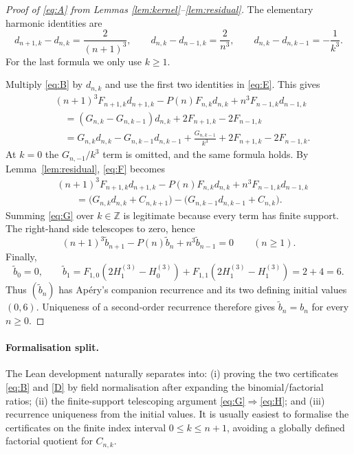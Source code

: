 \documentclass[11pt]{article}
\newcommand{\Hthree}[1]{H_{#1}^{(3)}}
\newcommand{\Kern}{F}
\newcommand{\Ppoly}{P}
\begin{document}
\begin{proof}[Proof of \eqref{eq:A} from Lemmas \ref{lem:kernel}--\ref{lem:residual}]
The elementary harmonic identities are
\[
 d_{n+1,k}-d_{n,k}=\frac{2}{(n+1)^3},\qquad
 d_{n,k}-d_{n-1,k}=\frac{2}{n^3},\qquad
 d_{n,k}-d_{n,k-1}=-\frac1{k^3}.                              \tag{E}\label{eq:E}
\]
For the last formula we only use $k\geq1$.

Multiply \eqref{eq:B} by $d_{n,k}$ and use the first two identities in
\eqref{eq:E}.  This gives
\begin{align*}
 &(n+1)^3\Kern_{n+1,k}d_{n+1,k}
       -\Ppoly(n)\Kern_{n,k}d_{n,k}
       +n^3\Kern_{n-1,k}d_{n-1,k}\\
 &\quad=(G_{n,k}-G_{n,k-1})d_{n,k}
       +2\Kern_{n+1,k}-2\Kern_{n-1,k}\\
 &\quad=G_{n,k}d_{n,k}-G_{n,k-1}d_{n,k-1}
       +\frac{G_{n,k-1}}{k^3}
       +2\Kern_{n+1,k}-2\Kern_{n-1,k}.
                                                                    \tag{F}\label{eq:F}
\end{align*}
At $k=0$ the $G_{n,-1}/k^3$ term is omitted, and the same formula holds.
By Lemma~\ref{lem:residual}, \eqref{eq:F} becomes
\begin{align*}
 &(n+1)^3\Kern_{n+1,k}d_{n+1,k}
       -\Ppoly(n)\Kern_{n,k}d_{n,k}
       +n^3\Kern_{n-1,k}d_{n-1,k}\\
 &\qquad=
 \bigl(G_{n,k}d_{n,k}+C_{n,k+1}\bigr)
 -\bigl(G_{n,k-1}d_{n,k-1}+C_{n,k}\bigr).                    \tag{G}\label{eq:G}
\end{align*}
Summing \eqref{eq:G} over $k\in\mathbb Z$ is legitimate because every
term has finite support.  The right-hand side telescopes to zero, hence
\[
 (n+1)^3\widetilde b_{n+1}-\Ppoly(n)\widetilde b_n
       +n^3\widetilde b_{n-1}=0\qquad(n\geq1).                \tag{H}\label{eq:H}
\]
Finally,
\[
 \widetilde b_0=0,
 \qquad
 \widetilde b_1=\Kern_{1,0}(2\Hthree1-\Hthree0)
          +\Kern_{1,1}(2\Hthree1-\Hthree1)=2+4=6.
\]
Thus $(\widetilde b_n)$ has Apéry's companion recurrence and its two
defining initial values $(0,6)$.  Uniqueness of a second-order recurrence
therefore gives $\widetilde b_n=b_n$ for every $n\geq0$.
\end{proof}

\paragraph{Formalisation split.}
The Lean development naturally separates into: (i) proving the two
certificates \eqref{eq:B} and \eqref{D} by field normalisation after
expanding the binomial/factorial ratios; (ii) the finite-support telescoping
argument \eqref{eq:G}$\Rightarrow$\eqref{eq:H}; and (iii) recurrence uniqueness
from the initial values.  It is usually easiest to formalise the certificates
on the finite index interval $0\leq k\leq n+1$, avoiding a globally defined
factorial quotient for $C_{n,k}$.
\end{document}

